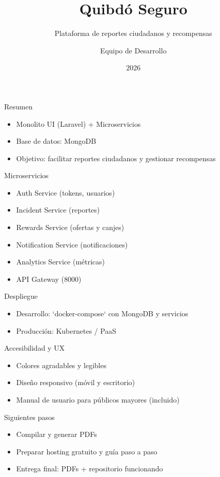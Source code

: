 \documentclass[11pt]{beamer}
\title{Quibdó Seguro}
\subtitle{Plataforma de reportes ciudadanos y recompensas}
\author{Equipo de Desarrollo}
\date{2026}
\begin{document}
\frame{\titlepage}

\begin{frame}{Resumen}
\begin{itemize}
  \item Monolito UI (Laravel) + Microservicios
  \item Base de datos: MongoDB
  \item Objetivo: facilitar reportes ciudadanos y gestionar recompensas
\end{itemize}
\end{frame}

\begin{frame}{Microservicios}
\begin{itemize}
  \item Auth Service (tokens, usuarios)
  \item Incident Service (reportes)
  \item Rewards Service (ofertas y canjes)
  \item Notification Service (notificaciones)
  \item Analytics Service (métricas)
  \item API Gateway (8000)
\end{itemize}
\end{frame}

\begin{frame}{Despliegue}
\begin{itemize}
  \item Desarrollo: `docker-compose` con MongoDB y servicios
  \item Producción: Kubernetes / PaaS
\end{itemize}
\end{frame}

\begin{frame}{Accesibilidad y UX}
\begin{itemize}
  \item Colores agradables y legibles
  \item Diseño responsivo (móvil y escritorio)
  \item Manual de usuario para públicos mayores (incluido)
\end{itemize}
\end{frame}

\begin{frame}{Siguientes pasos}
\begin{itemize}
  \item Compilar y generar PDFs
  \item Preparar hosting gratuito y guía paso a paso
  \item Entrega final: PDFs + repositorio funcionando
\end{itemize}
\end{frame}
\end{document}
